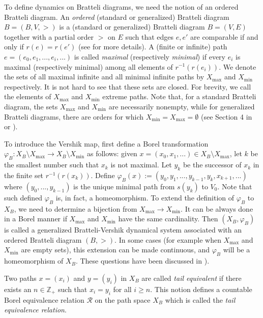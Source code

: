 \documentclass[11pt, twoside]{amsart}
\theoremstyle{definition}
\theoremstyle{remark}
\theoremstyle{plain}
\numberwithin{equation}{section}
\begin{document}
To define dynamics on Bratteli diagrams, we need the notion of an ordered Bratteli diagram.
An \textit{ordered} (standard or generalized) Bratteli diagram $B = (B, V, >)$ is a (standard or generalized) Bratteli diagram $B=(V,E)$ together with a partial order $>$ on $E$ such that edges $e,e'$ are comparable if and only if $r(e)=r(e')$ (see \cite{HPS1992, BezuglyiKarpel2016, BezuglyiJorgensenKarpelSanadhya2023} for more 
details). A (finite or infinite) path $e= (e_0,e_1,..., 
e_i,...)$ is called \textit{maximal} (respectively 
\textit{minimal}) if every $e_i$ is 
maximal (respectively minimal) among all elements of $r^{-1}(r(e_i))$. We denote the sets of all 
maximal infinite and all minimal infinite paths by $X_{\max}$ and 
$X_{\min}$ respectively. It is not hard to see that these sets are closed.
For brevity, we call the elements of $X_{\max}$ and 
$X_{\min}$ extreme paths. Note that, for a standard  Bratteli diagram, the sets $X_{\max}$ and 
$X_{\min}$ are necessarily nonempty, while for generalized Bratteli diagrams, there are orders for which $X_{\min} = X_{\max} = \emptyset$ (see Section 4 in \cite{BezuglyiJorgensenKarpelSanadhya2023} or \cite{BezuglyiDooleyKwiatkowski2006}). 

To introduce the Vershik map, first define a Borel transformation   $\varphi_B : X_B \setminus X_{\max} \rightarrow X_B \setminus X_{\min}$ as 
follows: given $x = (x_0, x_1,...)\in 
X_B\setminus X_{\max}$, let $k$ be the smallest number such that $x_k$ is not maximal. Let $y_k$ be the successor of $x_k$ in the finite set $r^{-1}(r(x_k))$. Define $\varphi_B(x):= (y_0, y_1,...,y_{k-1}, y_k,x_{k+1},...)$
where $(y_0, ..., y_{k-1})$ is the unique minimal path from 
$s(y_{k})$ to $V_0$.  Note that such defined $\varphi_B$  is, in fact, a homeomorphism. To extend the definition of $\varphi_B$ to $X_B$, we need to determine a bijection from $X_{\max} \rightarrow  X_{\min}$. It can be always done in a Borel manner if $X_{\max}$ and $X_{\min}$ have the same cardinality. Then $(X_B, \varphi_B)$ is called a generalized Bratteli-Vershik dynamical system associated with an ordered Bratteli diagram $(B, >)$.
In some cases (for example when $X_{\max}$ and $X_{\min}$ are empty sets), this extension can be made continuous, and $\varphi_B$ will be a 
homeomorphism of $X_B$. These questions have been discussed in 
\cite{BezuglyiJorgensenKarpelSanadhya2023, BezuglyiKarpelKwiatkowski2024, BezuglyiDooleyKwiatkowski2006}). 


Two paths $x= (x_i)$ and $y=(y_i)$ in $X_B$ are called 
\textit{tail equivalent} if there exists an $n \in \mathbb{Z}_+$ 
such that $x_i = y_i$ for all $i \geq n$. This notion defines a 
countable Borel equivalence relation $\mathcal R$ on the
path space $X_B$ which is called the \textit{tail equivalence 
relation}.
\end{document}
